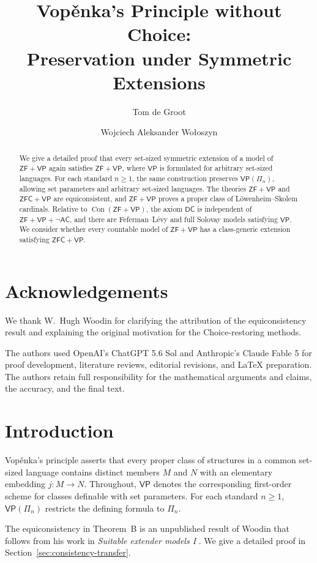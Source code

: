 \documentclass[11pt,a4paper]{amsart}
\title[Vop\v{e}nka's Principle without Choice]{Vop\v{e}nka's Principle without Choice:\\ Preservation under Symmetric Extensions}
\author{Tom de Groot}
\author{Wojciech Aleksander Wo{\l}oszyn}
\date{}
\newif\ifrevisionblue
\DeclareRobustCommand{\revision}[1]{{\ifrevisionblue\color{blue}\fi#1}}
\newcommand{\VP}{\mathsf{VP}}
\newcommand{\AC}{\mathsf{AC}}
\newcommand{\ZF}{\mathsf{ZF}}
\newcommand{\ZFC}{\mathsf{ZFC}}
\newcommand{\Con}{\operatorname{Con}}
\newcommand{\DC}{\mathsf{DC}}
\theoremstyle{plain}
\theoremstyle{definition}
\theoremstyle{remark}
\begin{document}
\begin{abstract}

We \revision{give a detailed proof} that every set-sized symmetric extension of a model of \(\ZF+\VP\) again satisfies \(\ZF+\VP\), where \(\VP\) is formulated for arbitrary set-sized languages.  For each standard \(n\geq1\), the same construction preserves \(\VP(\Pi_n)\), allowing set parameters and arbitrary set-sized languages.  The theories \(\ZF+\VP\) and \(\ZFC+\VP\) are equiconsistent, and \(\ZF+\VP\) proves a proper class of L\"owenheim--Skolem cardinals.  Relative to \(\Con(\ZF+\VP)\), the axiom \(\DC\) is independent of \(\ZF+\VP+\neg\AC\), and there are Feferman--L\'evy and full Solovay models satisfying \(\VP\).  \revision{We consider} whether every countable model of \(\ZF+\VP\) has a class-generic extension satisfying \(\ZFC+\VP\).

\end{abstract}

\maketitle

\section*{Acknowledgements}

\revision{We thank W.~Hugh Woodin for clarifying the attribution
of the equiconsistency result and explaining the original motivation
for the Choice-restoring methods.}

{The authors used OpenAI's ChatGPT 5.6 Sol and Anthropic's Claude Fable 5 for proof development, literature reviews, editorial revisions, and LaTeX preparation.  The authors retain full responsibility for the mathematical arguments and claims, the accuracy, and the final text.}

\section{Introduction}

Vop\v{e}nka's principle asserts that every proper class of structures in a common set-sized language contains distinct members $M$ and $N$ with an elementary embedding $j:M\to N$.  Throughout, $\VP$ denotes the corresponding first-order scheme for classes definable with set parameters.  For each standard $n\geq1$, $\VP(\Pi_n)$ restricts the defining formula to $\Pi_n$.

\revision{The equiconsistency in Theorem~B is an unpublished result
of Woodin that follows from his work in \emph{Suitable extender models I}
\cite{Woodin}. We give a detailed proof in
Section~\ref{sec:consistency-transfer}.}
\end{document}

